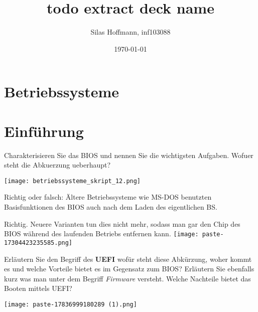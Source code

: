 \documentclass{article}
\title{todo extract deck name}
\author{Silas Hoffmann, inf103088}
\date{\today}
\begin{document}
\maketitle
\clearpage
\tableofcontents
\clearpage

\section{Betriebssysteme}
\section{Einführung}
\begin{tcolorbox}[colback=white!10!white,colframe=lightgray!75!black,
  savelowerto=\jobname_ex.tex,breakable,enhanced,lines before break=40]

\begin{center}
Charakterisieren Sie das BIOS und nennen Sie die wichtigsten Aufgaben. Wofuer steht die Abkuerzung ueberhaupt?

\end{center}

\tcblower

\justifying
\texttt{[image: betriebssysteme\_skript\_12.png]}

\end{tcolorbox}
\begin{tcolorbox}[colback=white!10!white,colframe=lightgray!75!black,
  savelowerto=\jobname_ex.tex,breakable,enhanced,lines before break=40]

\begin{center}
Richtig oder falsch: Ältere Betriebssysteme wie MS-DOS benutzten Basisfunktionen des BIOS auch nach dem Laden des eigentlichen BS.

\end{center}

\tcblower

\justifying
Richtig. Neuere Varianten tun dies nicht mehr, sodass man gar den Chip des BIOS während des laufenden Betriebs entfernen kann.
\texttt{[image: paste-17304423235585.png]}

\end{tcolorbox}
\begin{tcolorbox}[colback=white!10!white,colframe=lightgray!75!black,
  savelowerto=\jobname_ex.tex,breakable,enhanced,lines before break=40]

\begin{center}
Erläutern Sie den Begriff des 
\textbf{UEFI
}wofür steht diese Abkürzung, woher kommt es und welche Vorteile bietet es im Gegensatz zum BIOS?
Erläutern Sie ebenfalls kurz was man unter dem Begriff 
\textit{Firmware 
}versteht.
Welche Nachteile bietet das Booten mittels UEFI?

\end{center}

\tcblower

\justifying
\texttt{[image: paste-17836999180289 (1).png]}

\end{tcolorbox}
\end{document}
